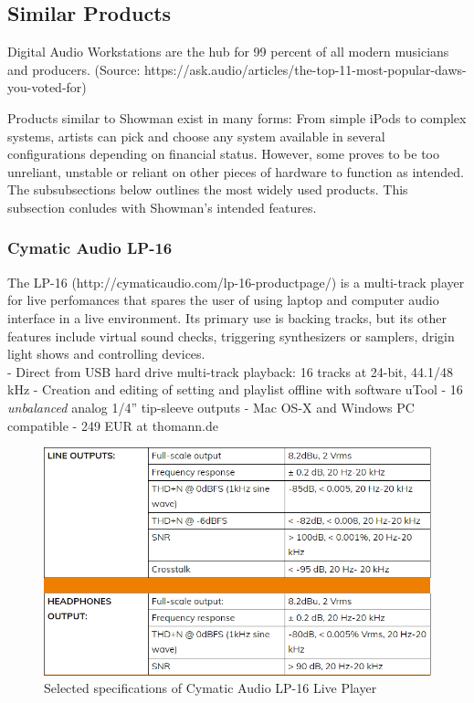 \subsection{Similar Products}
Digital Audio Workstations are the hub for 99 percent of all modern musicians and producers. (Source: https://ask.audio/articles/the-top-11-most-popular-daws-you-voted-for) \newline

Products similar to Showman exist in many forms: From simple iPods to complex systems, artists can pick and choose any system available in several configurations depending on financial status. However, some proves to be too unreliant, unstable or reliant on other pieces of hardware to function as intended. The subsubsections below outlines the most widely used products. This subsection conludes with Showman's intended features. \\

\subsubsection{Cymatic Audio LP-16}
The LP-16 (http://cymaticaudio.com/lp-16-productpage/) is a multi-track player for live perfomances that spares the user of using laptop and computer audio interface in a live environment. Its primary use is backing tracks, but its other features include virtual sound checks, triggering synthesizers or samplers, drigin light shows and controlling devices. \\

- Direct from USB hard drive multi-track playback: 16 tracks at 24-bit, 44.1/48 kHz
- Creation and editing of setting and playlist offline with software uTool
- 16 \textit{unbalanced} analog 1/4'' tip-sleeve outputs
- Mac OS-X and Windows PC compatible
- 249 EUR at thomann.de

\begin{figure}[H]
\centering
\includegraphics[scale=0.7]{./pictures/lp16.png}
\caption{Selected specifications of Cymatic Audio LP-16 Live Player}
\label{fig:lp16.png}
\end{figure}

